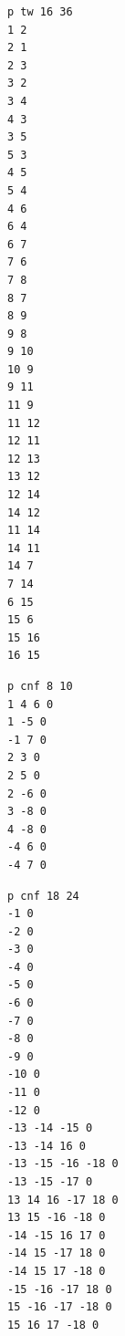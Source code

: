 \documentclass[a4paper, 12pt]{scrartcl}
\begin{document}
\lstset{numbers=none}
\begin{lstlisting}[caption={Edge encoding of example graph with 16 vertices}, label={lst:minvc16}]
p tw 16 36
1 2
2 1
2 3
3 2
3 4
4 3
3 5
5 3
4 5
5 4
4 6
6 4
6 7
7 6
7 8
8 7
8 9
9 8
9 10
10 9
9 11
11 9
11 12
12 11
12 13
13 12
12 14
14 12
11 14
14 11
14 7
7 14
6 15
15 6
15 16
16 15
\end{lstlisting}
\begin{lstlisting}[caption={CNF clauses from example 4.1 on page 27 \cite{DiplomarbeitZisser}}, label={lst:clausesDA41}]
p cnf 8 10
1 4 6 0
1 -5 0
-1 7 0
2 3 0
2 5 0
2 -6 0
3 -8 0
4 -8 0
-4 6 0
-4 7 0
\end{lstlisting}
\begin{lstlisting}[caption={CNF clauses from random example with 12 units},label={lst:example18-24}]
p cnf 18 24
-1 0
-2 0
-3 0
-4 0
-5 0
-6 0
-7 0
-8 0
-9 0
-10 0
-11 0
-12 0
-13 -14 -15 0
-13 -14 16 0
-13 -15 -16 -18 0
-13 -15 -17 0
13 14 16 -17 18 0
13 15 -16 -18 0
-14 -15 16 17 0
-14 15 -17 18 0
-14 15 17 -18 0
-15 -16 -17 18 0
15 -16 -17 -18 0
15 16 17 -18 0
\end{lstlisting}


\end{document}
